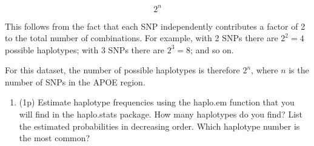 \documentclass[
]{article}
\providecommand{\tightlist}{%
  \setlength{\itemsep}{0pt}\setlength{\parskip}{0pt}}
\begin{document}
\[2^n\]

This follows from the fact that each SNP independently contributes a
factor of 2 to the total number of combinations. For example, with 2
SNPs there are \(2^2 = 4\) possible haplotypes; with 3 SNPs there are
\(2^3 = 8\); and so on.

For this dataset, the number of possible haplotypes is therefore
\(2^n\), where \(n\) is the number of SNPs in the APOE region.

\begin{enumerate}
\def\labelenumi{\arabic{enumi}.}
\setcounter{enumi}{2}
\tightlist
\item
  (1p) Estimate haplotype frequencies using the haplo.em function that
  you will find in the haplo.stats package. How many haplotypes do you
  find? List the estimated probabilities in decreasing order. Which
  haplotype number is the most common?
\end{enumerate}
\end{document}

